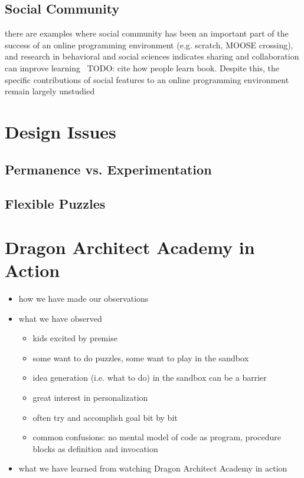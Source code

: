 \documentclass{sig-alternate}
\newcommand{\TODO}[1]{{\color{red} TODO: #1}}
\newcommand{\gametitle}{{\color{RoyalPurple} Dragon Architect Academy}}
\begin{document}
\subsection{Social Community}
there are examples where social community has been an important part of the success of an online programming environment (e.g. scratch, MOOSE crossing), and research in behavioral and social sciences indicates sharing and collaboration can improve learning~\TODO{cite how people learn book}. Despite this, the specific contributions of social features to an online programming environment remain largely unstudied

\section{Design Issues}

\subsection{Permanence vs. Experimentation}

\subsection{Flexible Puzzles}


\section{\gametitle{} in Action}
\label{sec:action}
\begin{itemize}
\item how we have made our observations
\item what we have observed
\begin{itemize}
\item kids excited by premise
\item some want to do puzzles, some want to play in the sandbox
\item idea generation (i.e. what to do) in the sandbox can be a barrier
\item great interest in personalization
\item often try and accomplish goal bit by bit
\item common confusions: no mental model of code as program, procedure blocks as definition and invocation
\end{itemize}

\item what we have learned from watching \gametitle{} in action
\end{itemize}
\end{document}
